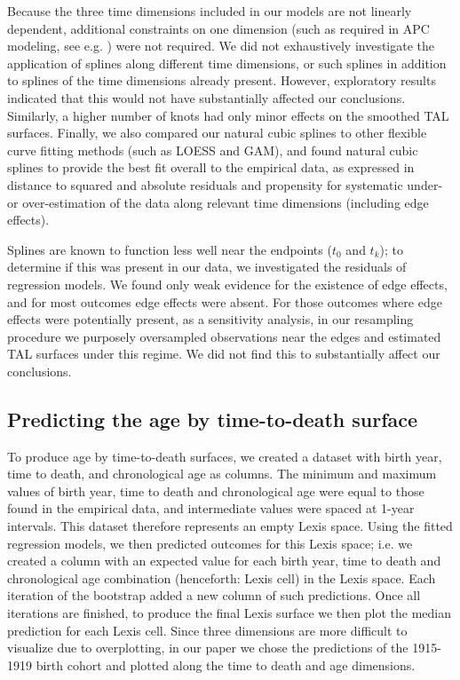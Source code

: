 \documentclass[12pt,oneside,a4paper]{article} %
\begin{document}
\begin{appendices}
Because the three time dimensions included in our models are not linearly
dependent, additional constraints on one dimension (such as required in APC
modeling, see e.g. \citet{clayton1987models}) were not required. We did not exhaustively investigate the application of splines along different time dimensions, or such splines in addition to splines of the time dimensions already present. However, exploratory results indicated that this would not have substantially affected our conclusions. Similarly, a higher number of knots had only minor effects on the smoothed TAL surfaces. Finally, we also compared our natural cubic splines to other flexible curve fitting methods (such as LOESS and GAM), and found natural cubic splines to provide the best fit overall to the empirical data, as expressed in distance to squared and absolute residuals and propensity for systematic under- or over-estimation of the data along relevant time dimensions (including edge effects).

Splines are known to function less well near the endpoints ($t_0$ and $t_k$); to determine if this was present in our data, we investigated the residuals of regression models. We found only weak evidence for the existence of edge effects, and for most outcomes edge effects were absent. For those outcomes where edge effects were potentially present, as a sensitivity analysis, in our resampling procedure we purposely oversampled observations near the edges and estimated TAL surfaces under this regime. We did not find this to substantially affect our conclusions. 

\subsection{Predicting the age by time-to-death surface}
To produce age by time-to-death surfaces, we created a dataset with birth year,
time to death, and chronological age as columns. The minimum and maximum values of birth year, time to death and chronological age were equal to those found in the empirical data, and intermediate values were spaced at 1-year intervals. This dataset therefore represents an empty Lexis space. Using the fitted regression models, we then predicted outcomes for this Lexis space; i.e. we created a column with an expected value for each birth year, time to death and chronological age combination (henceforth: Lexis cell) in the Lexis space. Each iteration of the bootstrap added a new column of such predictions. Once all iterations are finished, to produce the final Lexis surface we then plot the median prediction for each Lexis cell. Since three dimensions are more difficult to visualize due to overplotting, in our paper we chose the predictions of the 1915-1919 birth cohort and plotted along the time to death and age dimensions.


\end{appendices}
\end{document}
